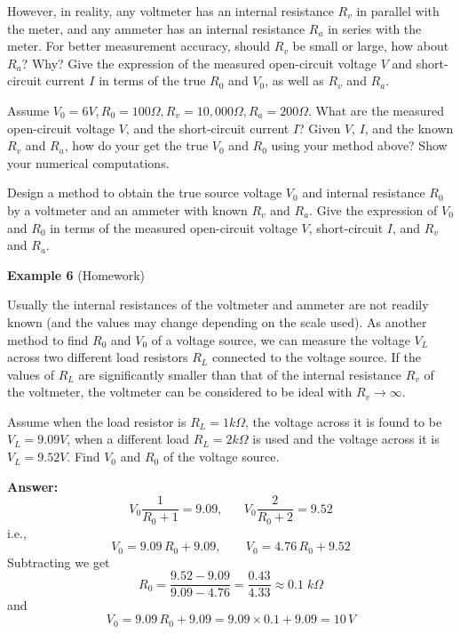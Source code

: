 \documentclass{article}
\begin{document}
However, in reality, any voltmeter has an internal resistance $R_v$ in 
parallel with the meter, and any ammeter has an internal resistance $R_a$ 
in series with the meter. For better measurement accuracy, should $R_v$ be
small or large, how about $R_a$? Why? Give the expression of the measured
open-circuit voltage $V$ and short-circuit current $I$ in terms of the
true $R_0$ and $V_0$, as well as $R_v$ and $R_a$.

Assume $V_0=6V, R_0=100\Omega, R_v=10,000 \Omega, R_a=200 \Omega$. What
are the measured open-circuit voltage $V$, and the short-circuit current 
$I$? Given $V$, $I$, and the known $R_v$ and $R_a$, how do your get the 
true $V_0$ and $R_0$ using your method above? Show your numerical computations.


Design a method to obtain the true source voltage $V_0$ and internal
resistance $R_0$ by a voltmeter and an ammeter with known $R_v$ and $R_a$.
Give the expression of $V_0$ and $R_0$ in terms of the measured open-circuit
voltage $V$, short-circuit $I$, and $R_v$ and $R_a$. 



{\bf Example 6} (Homework)

Usually the internal resistances of the voltmeter and ammeter are not 
readily known (and the values may change depending on the scale used). 
As another method to find $R_0$ and $V_0$ of a voltage source, we can 
measure the voltage $V_L$ across two different load resistors $R_L$ 
connected to the voltage source. If the values of $R_L$ are significantly
smaller than that of the internal resistance $R_v$ of the voltmeter, the 
voltmeter can be considered to be ideal with $R_v\rightarrow \infty$. 

Assume when the load resistor is $R_L=1 k\Omega$, the voltage across it 
is found to be $V_L=9.09V$, when a different load $R_L=2 k\Omega$ is used 
and the voltage across it is $V_L=9.52V$. Find $V_0$ and $R_0$ of the 
voltage source.

{\bf Answer:}
\begin{equation}
  V_0\frac{1}{R_0+1}=9.09,\;\;\;\;\;\;V_0\frac{2}{R_0+2}=9.52
\end{equation}
i.e.,
\begin{equation}
  V_0=9.09\,R_0+9.09,\;\;\;\;\;\;\;V_0=4.76\,R_0+9.52
\end{equation}
Subtracting we get 
\begin{equation}
  R_0=\frac{9.52-9.09}{9.09-4.76}=\frac{0.43}{4.33}\approx 0.1\;k\Omega
\end{equation}
and 
\begin{equation}
  V_0=9.09\,R_0+9.09=9.09\times 0.1+9.09=10\,V
\end{equation}
\end{document}
